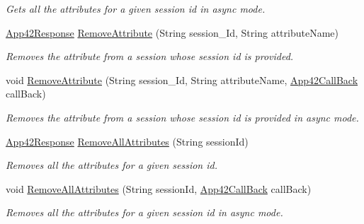 \begin{DoxyCompactItemize}
\begin{DoxyCompactList}\small\item\em Gets all the attributes for a given session id in async mode. \end{DoxyCompactList}\item 
\hyperlink{classcom_1_1shephertz_1_1app42_1_1paas_1_1sdk_1_1csharp_1_1_app42_response}{App42\+Response} \hyperlink{classcom_1_1shephertz_1_1app42_1_1paas_1_1sdk_1_1csharp_1_1session_1_1_session_service_a1de797dd2bccc593cbe20157fa3adea8}{Remove\+Attribute} (String session\+\_\+\+Id, String attribute\+Name)
\begin{DoxyCompactList}\small\item\em Removes the attribute from a session whose session id is provided. \end{DoxyCompactList}\item 
void \hyperlink{classcom_1_1shephertz_1_1app42_1_1paas_1_1sdk_1_1csharp_1_1session_1_1_session_service_a3f3573aa689330f8bdb2d1365ed3e19e}{Remove\+Attribute} (String session\+\_\+\+Id, String attribute\+Name, \hyperlink{interfacecom_1_1shephertz_1_1app42_1_1paas_1_1sdk_1_1csharp_1_1_app42_call_back}{App42\+Call\+Back} call\+Back)
\begin{DoxyCompactList}\small\item\em Removes the attribute from a session whose session id is provided in async mode. \end{DoxyCompactList}\item 
\hyperlink{classcom_1_1shephertz_1_1app42_1_1paas_1_1sdk_1_1csharp_1_1_app42_response}{App42\+Response} \hyperlink{classcom_1_1shephertz_1_1app42_1_1paas_1_1sdk_1_1csharp_1_1session_1_1_session_service_a879a8d6970acbbac7cee0ee95f83df67}{Remove\+All\+Attributes} (String session\+Id)
\begin{DoxyCompactList}\small\item\em Removes all the attributes for a given session id. \end{DoxyCompactList}\item 
void \hyperlink{classcom_1_1shephertz_1_1app42_1_1paas_1_1sdk_1_1csharp_1_1session_1_1_session_service_a6b65abb1c2d9cae8ffad571cfc8c56fa}{Remove\+All\+Attributes} (String session\+Id, \hyperlink{interfacecom_1_1shephertz_1_1app42_1_1paas_1_1sdk_1_1csharp_1_1_app42_call_back}{App42\+Call\+Back} call\+Back)
\begin{DoxyCompactList}\small\item\em Removes all the attributes for a given session id in async mode. \end{DoxyCompactList}\end{DoxyCompactItemize}
